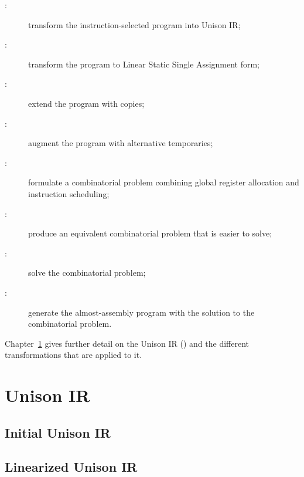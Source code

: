 \documentclass[11pt]{report}
\newenvironment{colorBox}[1]
 {\begin{tcolorbox}[
    breakable,
    colback=#1,
    colframe=white,
    boxrule=0pt
  ]}
 {\end{tcolorbox}}
\newenvironment{codeBox}
 {\begin{colorBox}{bgcolor4!20}}
 {\end{colorBox}}
\begin{document}
\begin{description}

\item [:] transform the instruction-selected program into
  Unison IR;

\item [:] transform the program to Linear Static Single
  Assignment form;

\item [:] extend the program with copies;

\item [:] augment the program with alternative temporaries;

\item [:] formulate a combinatorial problem combining global
  register allocation and instruction scheduling;

\item [:] produce an equivalent combinatorial problem
  that is easier to solve;

\item [:] solve the combinatorial problem;

\item [:] generate the almost-assembly program with the
  solution to the combinatorial problem.

\end{description}

Chapter~\ref{sec:unison-ir} gives further detail on the Unison IR ()
and the different transformations that are applied to it.

\chapter{Unison IR}
\label{sec:unison-ir}

\section{Initial Unison IR}

\begin{codeBox}
\end{codeBox}

\section{Linearized Unison IR}
\end{document}
